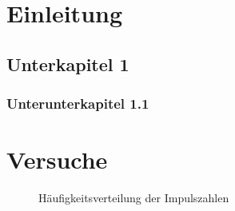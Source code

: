 \section{Einleitung}

\subsection{Unterkapitel 1}
\subsubsection{Unterunterkapitel 1.1}

\section{Versuche}

\begin{figure}[h!]
	\centering
	
	\caption{Häufigkeitsverteilung der Impulszahlen}
\end{figure}
